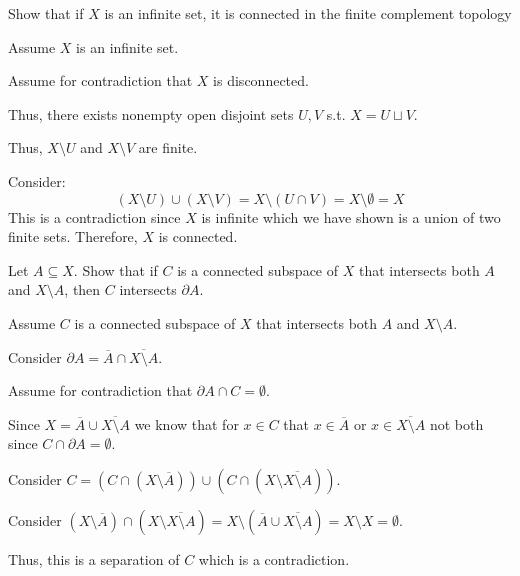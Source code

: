 \vspace{1in}
\begin{pb}{}
    Show that if $X$ is an infinite set, it is connected in the finite complement topology
\end{pb}
\begin{problemproof}
    Assume $X$ is an infinite set.

    Assume for contradiction that $X$ is disconnected.

    Thus, there exists nonempty open disjoint sets $U,V$ s.t. $X=U \sqcup V$.

    Thus, $X \setminus U$ and $X \setminus V$ are finite.

    Consider:\[(X \setminus U) \cup (X \setminus V)=X \setminus (U \cap V)= X \setminus \emptyset = X\]
    This is a contradiction since $X$ is infinite which we have shown is a union of two finite sets. Therefore, $X$ is connected.
\end{problemproof}

\vspace{1in}
\begin{pb}{}
    Let $A \subseteq X$. Show that if $C$ is a connected subspace of $X$ that intersects both $A$ and $X\setminus A$, then $C$ intersects $\partial A$.
\end{pb}
\begin{problemproof}
    Assume $C$ is a connected subspace of $X$ that intersects both $A$ and $X \setminus A$.

    Consider $\partial A=\overline{A} \cap \overline{X \setminus A}$.

    Assume for contradiction that $\partial A \cap C = \emptyset$.

    Since $X=\overline{A} \cup \overline{X \setminus A}$ we know that for $x \in C$ that $x \in \overline{A}$ or $x \in \overline{X \setminus A}$ not both since $C \cap \partial{A}=\emptyset$.

    Consider $C=(C \cap (X \setminus \overline{A})) \cup (C \cap ( X\setminus \overline{X \setminus A}))$.

    Consider $(X \setminus \overline{A}) \cap (X \setminus \overline{X \setminus A})=X \setminus({\overline{A} \cup \overline{X \setminus A}})= X \setminus X = \emptyset$.

    Thus, this is a separation of $C$ which is a contradiction.
\end{problemproof}

